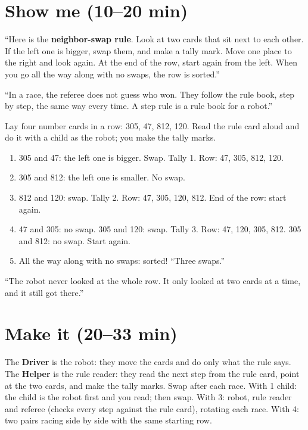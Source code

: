 \section{Show me (10--20 min)}
\begin{teacherscript}
\enquote{Here is the \textbf{neighbor-swap rule}. Look at two cards that sit next to each other. If the left one is bigger, swap them, and make a tally mark. Move one place to the right and look again. At the end of the row, start again from the left. When you go all the way along with no swaps, the row is sorted.}
\end{teacherscript}

\begin{analogy}
\enquote{In a race, the referee does not guess who won. They follow the rule book, step by step, the same way every time. A step rule is a rule book for a robot.}
\end{analogy}

\begin{workedexample}
Lay four number cards in a row: 305, 47, 812, 120. Read the rule card aloud and do it with a child as the robot; you make the tally marks.
\begin{enumerate}[leftmargin=1.4em,itemsep=1pt]
  \item 305 and 47: the left one is bigger. Swap. Tally 1. Row: 47, 305, 812, 120.
  \item 305 and 812: the left one is smaller. No swap.
  \item 812 and 120: swap. Tally 2. Row: 47, 305, 120, 812. End of the row: start again.
  \item 47 and 305: no swap. 305 and 120: swap. Tally 3. Row: 47, 120, 305, 812. 305 and 812: no swap. Start again.
  \item All the way along with no swaps: sorted! \enquote{Three swaps.}
\end{enumerate}
\enquote{The robot never looked at the whole row. It only looked at two cards at a time, and it still got there.}
\end{workedexample}

\section{Make it (20--33 min)}
\begin{pairroles}
The \textbf{Driver} is the robot: they move the cards and do only what the rule says. The \textbf{Helper} is the rule reader: they read the next step from the rule card, point at the two cards, and make the tally marks. Swap after each race. With 1 child: the child is the robot first and you read; then swap. With 3: robot, rule reader and referee (checks every step against the rule card), rotating each race. With 4: two pairs racing side by side with the same starting row.
\end{pairroles}

